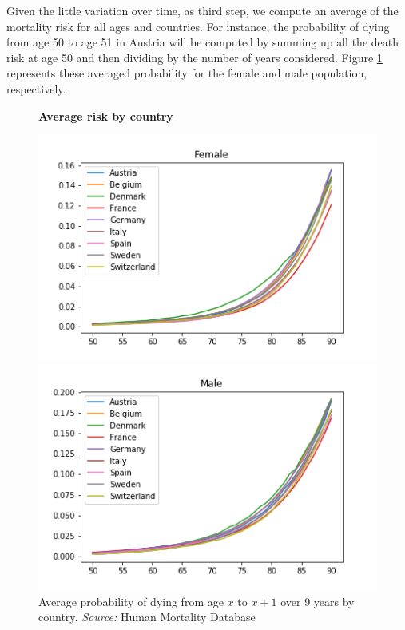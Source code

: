 Given the little variation over time, as third step, we compute an average of the mortality risk for all ages and countries.
For instance, the probability of dying from age 50 to age 51 in Austria will be computed by summing up all the death risk at age 50 and then dividing by the number of years considered. Figure \ref{fig:averages} represents these averaged probability for the female and male population, respectively. \\



\begin{figure}[H]
    \centering \textbf{Average risk by country}\par\medskip
    \begin{minipage}{.5\textwidth}
        \centering
        \includegraphics[scale=.5]{images/Average_mortality_female.png}
    \end{minipage}%
   \begin{minipage}{.5\textwidth}
        \centering
       \includegraphics[scale=.5]{images/Average_mortality_male.png}
    \end{minipage}
    \caption{Average probability of dying from age $x$ to $x+1$   over 9 years by country. \textit{Source:} Human Mortality Database }
    \label{fig:averages}
\end{figure}

